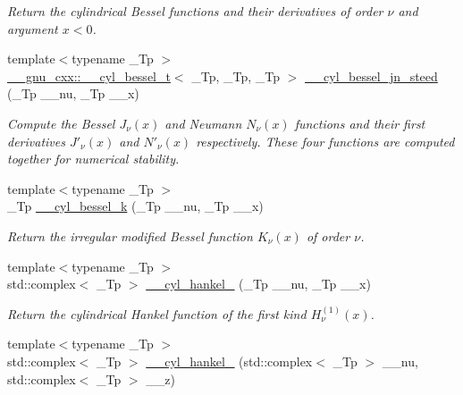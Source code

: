 \begin{DoxyCompactItemize}
\begin{DoxyCompactList}\small\item\em Return the cylindrical Bessel functions and their derivatives of order $ \nu $ and argument $ x < 0 $. \end{DoxyCompactList}\item 
{\footnotesize template$<$typename \+\_\+\+Tp $>$ }\\\hyperlink{struct____gnu__cxx_1_1____cyl__bessel__t}{\+\_\+\+\_\+gnu\+\_\+cxx\+::\+\_\+\+\_\+cyl\+\_\+bessel\+\_\+t}$<$ \+\_\+\+Tp, \+\_\+\+Tp, \+\_\+\+Tp $>$ \hyperlink{namespacestd_1_1____detail_a92e231f659735cf87c67a35f5ac4dd36}{\+\_\+\+\_\+cyl\+\_\+bessel\+\_\+jn\+\_\+steed} (\+\_\+\+Tp \+\_\+\+\_\+nu, \+\_\+\+Tp \+\_\+\+\_\+x)
\begin{DoxyCompactList}\small\item\em Compute the Bessel $ J_\nu(x) $ and Neumann $ N_\nu(x) $ functions and their first derivatives $ J'_\nu(x) $ and $ N'_\nu(x) $ respectively. These four functions are computed together for numerical stability. \end{DoxyCompactList}\item 
{\footnotesize template$<$typename \+\_\+\+Tp $>$ }\\\+\_\+\+Tp \hyperlink{namespacestd_1_1____detail_ac9152f2369a18aa795fe24ccfa6dcf12}{\+\_\+\+\_\+cyl\+\_\+bessel\+\_\+k} (\+\_\+\+Tp \+\_\+\+\_\+nu, \+\_\+\+Tp \+\_\+\+\_\+x)
\begin{DoxyCompactList}\small\item\em Return the irregular modified Bessel function $ K_{\nu}(x) $ of order $ \nu $. \end{DoxyCompactList}\item 
{\footnotesize template$<$typename \+\_\+\+Tp $>$ }\\std\+::complex$<$ \+\_\+\+Tp $>$ \hyperlink{namespacestd_1_1____detail_aac3fc60c1210e8f2ae3cf05cdc7bad84}{\+\_\+\+\_\+cyl\+\_\+hankel\+\_} (\+\_\+\+Tp \+\_\+\+\_\+nu, \+\_\+\+Tp \+\_\+\+\_\+x)
\begin{DoxyCompactList}\small\item\em Return the cylindrical Hankel function of the first kind $ H^{(1)}_\nu(x) $. \end{DoxyCompactList}\item 
{\footnotesize template$<$typename \+\_\+\+Tp $>$ }\\std\+::complex$<$ \+\_\+\+Tp $>$ \hyperlink{namespacestd_1_1____detail_a9904b6007ef78ef777ac8345f6e47960}{\+\_\+\+\_\+cyl\+\_\+hankel\+\_} (std\+::complex$<$ \+\_\+\+Tp $>$ \+\_\+\+\_\+nu, std\+::complex$<$ \+\_\+\+Tp $>$ \+\_\+\+\_\+z)

\end{DoxyCompactItemize}
